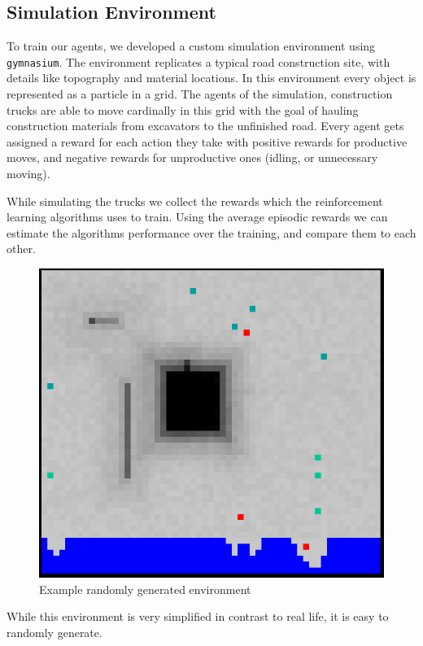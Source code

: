 \documentclass[conference]{IEEEtran}
\begin{document}
	\subsection{Simulation Environment}
	To train our agents, we developed a custom simulation environment using \texttt{gymnasium}. The environment replicates a typical road construction site, with details like topography and material locations. In this environment every object is represented as a particle in a grid.
	The agents of the simulation, construction trucks are able to move cardinally in this grid with the goal of hauling construction materials from excavators to the unfinished road.
	Every agent gets assigned a reward for each action they take with positive rewards for productive moves, and negative rewards for unproductive ones (idling, or unnecessary moving).

	While simulating the trucks we collect the rewards which the reinforcement learning algorithms uses to train.
	Using the average episodic rewards we can estimate the algorithms performance over the training, and compare them to each other.

	\begin{figure}[h!]
		\includegraphics[width=\columnwidth]{graphs/example_env.png}
		\caption{Example randomly generated environment}
	\end{figure}

	While this environment is very simplified in contrast to real life, it is easy to randomly generate.
\end{document}
